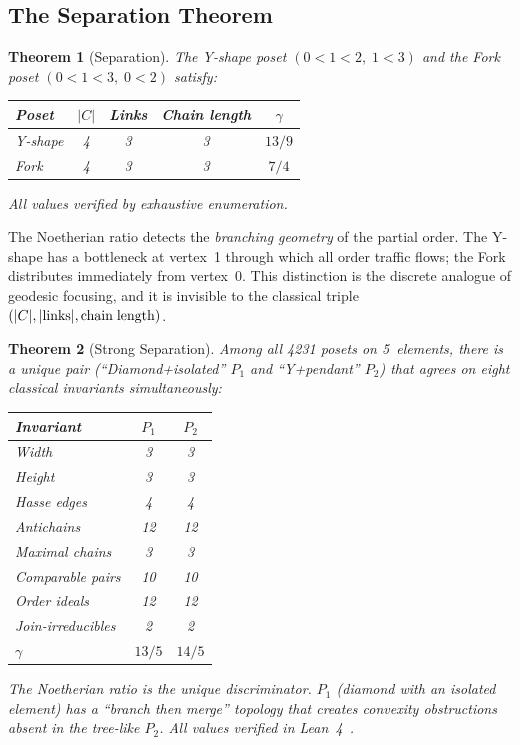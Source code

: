 \documentclass[11pt,a4paper]{article}
\theoremstyle{plain}
\newtheorem{theorem}{Theorem}[section]
\theoremstyle{definition}
\theoremstyle{remark}
\begin{document}
\subsection{The Separation Theorem}\label{sec:separation}

\begin{theorem}[Separation]\label{thm:separation}
The Y-shape poset $(0 < 1 < 2,\; 1 < 3)$ and the Fork poset $(0 < 1 < 3,\; 0 < 2)$ satisfy:

\medskip
\begin{center}
\begin{tabular}{lcccc}
\toprule
Poset & $|C|$ & Links & Chain length & $\gamma$ \\
\midrule
Y-shape & 4 & 3 & 3 & $13/9$ \\[2pt]
Fork & 4 & 3 & 3 & $7/4$ \\
\bottomrule
\end{tabular}
\end{center}
\medskip

\noindent All values verified by exhaustive enumeration.
\end{theorem}

The Noetherian ratio detects the \emph{branching geometry} of the partial order.
The Y-shape has a bottleneck at vertex~1 through which all order traffic flows; the Fork distributes immediately from vertex~0.
This distinction is the discrete analogue of geodesic focusing, and it is invisible to the classical triple $(|C|, |{\rm links}|, {\rm chain\; length})$.

\begin{theorem}[Strong Separation]\label{thm:separation5}
Among all 4231 posets on 5~elements, there is a unique pair
(``Diamond+isolated'' $P_1$ and ``Y+pendant'' $P_2$) that agrees on
eight classical invariants simultaneously:

\medskip
\begin{center}
\begin{tabular}{lcc}
\toprule
Invariant & $P_1$ & $P_2$ \\
\midrule
Width & 3 & 3 \\
Height & 3 & 3 \\
Hasse edges & 4 & 4 \\
Antichains & 12 & 12 \\
Maximal chains & 3 & 3 \\
Comparable pairs & 10 & 10 \\
Order ideals & 12 & 12 \\
Join-irreducibles & 2 & 2 \\
\midrule
$\gamma$ & $13/5$ & $14/5$ \\
\bottomrule
\end{tabular}
\end{center}
\medskip

\noindent The Noetherian ratio is the unique discriminator.
$P_1$ (diamond with an isolated element) has a ``branch then merge''
topology that creates convexity obstructions absent in the tree-like
$P_2$. All values verified in Lean~4~\cite{leanrepo}.
\end{theorem}
\end{document}
